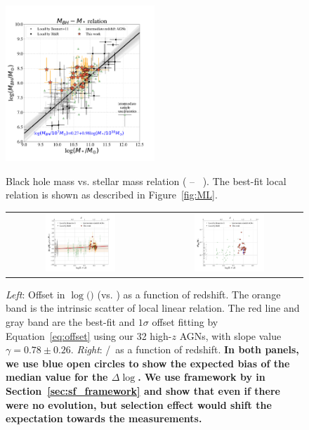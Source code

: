 \documentclass[apj]{emulateapj}
\begin{document}
\begin{figure}
\centering
{
\includegraphics[width=0.5\textwidth]{fig/MBH-Mstar.pdf}
}
\caption{\label{fig:MM} 
Black hole mass vs. stellar mass relation ( \mbh -- \smass\ ). The best-fit local relation is shown as described in Figure~\ref{fig:ML}.
}
\end{figure} 

\begin{figure}
\centering
\begin{tabular}{c c}
{\includegraphics[width=0.5\textwidth]{fig/MBH-Mstar-vz_style1.pdf}}&
{\includegraphics[width=0.5\textwidth]{fig/MBH-Mstar-vz_style0.pdf}}\\
\end{tabular}
\caption{\label{fig:MM-vz} 
 {\it Left}: Offset in  $\log($\mbh$)$ (vs. \smass) as a function of redshift. The orange band is the intrinsic scatter of local linear relation. The red line and gray band are the best-fit and $1\sigma$ offset fitting by Equation~\ref{eq:offset} using our 32 high-$z$ AGNs, with slope value $\gamma  = 0.78 \pm 0.26$. {\it Right}: \mbh/\smass\ as a function of redshift. {\bf In both panels, we use blue open circles to show the expected bias of the median value for the $\Delta \log$\mbh. We use framework by \citet{Schulze2011} in Section~\ref{sec:sf_framework} and show that even if there were no evolution, but selection effect would shift the expectation towards the measurements.}}
\end{figure} 
\end{document}

